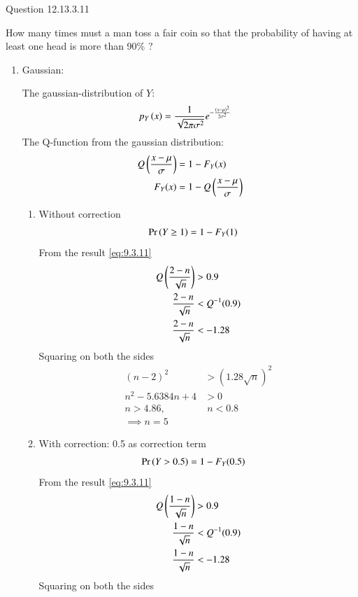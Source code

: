 \documentclass[journal,12pt,twocolumn]{IEEEtran}
\theoremstyle{remark}
\begin{document}
Question 12.13.3.11

How many times must a man toss a fair coin so that the probability of having at least
one head is more than 90\% ?

\solution
\begin{enumerate}
\begin{table}[!ht]

\end{table}

\item Gaussian:

The gaussian-distribution of $Y$:
\begin{align}
	p_Y\left(x\right) &= \frac{1}{\sqrt{2\pi{\sigma}^2}} e^{-\frac{\left(x-\mu\right)^2}{2{\sigma}^2}}
\end{align}
The Q-function from the gaussian distribution:
\begin{align}
	Q\left(\frac{x-\mu}{\sigma}\right) &= 1 - F_Y(x)\\
	F_Y(x) &= 1 - Q\left(\frac{x-\mu}{\sigma}\right)\label{eq:9.3.11}
\end{align}
\begin{enumerate}
\item Without correction
\begin{align}
	\Pr\left(Y \geq 1\right) &= 1 - F_Y(1)
\end{align}
From the result \eqref{eq:9.3.11}
\begin{align}
	Q\left(\frac{2-n}{\sqrt{n}}\right)&>0.9\\
	\frac{2-n}{\sqrt{n}} &< Q^{-1}(0.9)\\
	\frac{2-n}{\sqrt{n}} &< -1.28
\end{align}
Squaring on both the sides
\begin{align}
	(n-2)^2 &> (1.28\sqrt{n})^2\\
	n^2 - 5.6384n + 4 &> 0\\
	n > 4.86, &\; n < 0.8 \\
	\implies n = 5
\end{align}
\item With correction: 0.5 as correction term
\begin{align}
	\Pr\left(Y > 0.5\right) &= 1-F_Y(0.5)
\end{align}
From the result \eqref{eq:9.3.11}
\begin{align}
	Q\left(\frac{1-n}{\sqrt{n}}\right)&>0.9\\
	\frac{1-n}{\sqrt{n}} &< Q^{-1}(0.9)\\
	\frac{1-n}{\sqrt{n}} &< -1.28
\end{align}
Squaring on both the sides
\begin{align}

\end{align}
\end{enumerate}
\end{enumerate}
\end{document}
